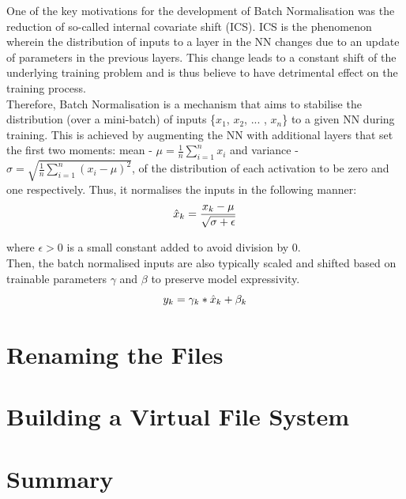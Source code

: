 One of the key motivations for the development of Batch Normalisation was the reduction of so-called internal covariate shift (ICS). ICS is the phenomenon wherein the distribution of inputs to a layer in the NN changes due to an update of parameters in the previous layers. This change leads to a constant shift of the underlying training problem and is thus believe to have detrimental effect on the training process. \\

Therefore, Batch Normalisation is a mechanism that aims to stabilise the distribution (over a mini-batch) of inputs \{$x_1$, $x_2$, ... , $x_n$\} to a given NN during training. This is achieved by augmenting the NN with additional layers that set the first two moments: mean - $\mu = \frac{1}{n} \sum_{i=1}^n x_i$ and variance - $\sigma = \sqrt{\frac{1}{n} \sum_{i=1}^n (x_i - \mu) ^ 2}$, of the distribution of each activation to be zero and one respectively. Thus, it normalises the inputs in the following manner: \\

\begin{equation}
  \centering
  \hat{x}_k = \frac{x_k - \mu}{\sqrt{\sigma + \epsilon}}
\end{equation}

where $\epsilon > 0$ is a small constant added to avoid division by 0. \\

Then, the batch normalised inputs are also typically scaled and shifted based on trainable parameters $\gamma$ and $\beta$ to preserve model expressivity. \\

\begin{equation}
  \centering
  y_k = \gamma_k * \hat{x}_k + \beta_k
\end{equation}



\section{Renaming the Files}

\section{Building a Virtual File System}


\section{Summary}


